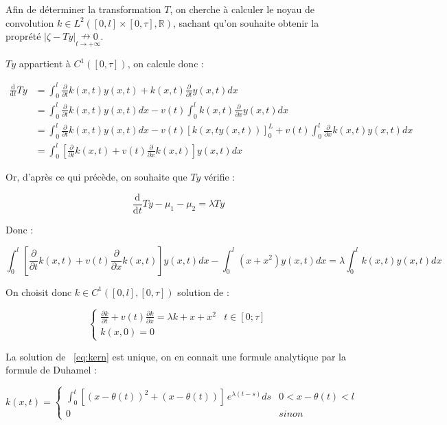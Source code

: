 \documentclass[a4paper]{article}
\begin{document}
Afin de déterminer la transformation $T$, 
on cherche à calculer le noyau de convolution $k \in L^2 ([0,l]\times[0,\tau],\mathbb{R})$,
sachant qu'on souhaite obtenir la proprété $|\zeta - Ty| \underset{t\to+\infty}{\nrightarrow 0}$.

$Ty$ appartient à $C^1([0,\tau])$, on calcule donc :

\[
\begin{split}
	\frac{\mathrm{d}}{\mathrm{d}t}Ty &= \int_0^l \frac{\partial}{\partial t}k(x,t) y(x,t) + k(x,t)\frac{\partial}{\partial t}y(x,t) dx \\
	                                 &= \int_0^l \frac{\partial}{\partial t}k(x,t) y(x,t)dx - v(t) \int_0^l k(x,t)\frac{\partial}{\partial x}y(x,t) dx \\
									 &= \int_0^l \frac{\partial}{\partial t}k(x,t) y(x,t)dx -v(t) [k(x,ty(x,t))]_0^L +v(t) \int_0^l \frac{\partial}{\partial x}k(x,t) y(x,t)dx \\
									 &= \int_0^l [\frac{\partial}{\partial t}k(x,t)+v(t)\frac{\partial}{\partial x}k(x,t)] y(x,t) dx
\end{split}
\]

Or, d'après ce qui précède, on souhaite que $Ty$ vérifie :

\[ \frac{\mathrm{d}}{\mathrm{d}t}Ty - \mu_1 - \mu_2 = \lambda Ty \]

Donc :

\[
\int_0^l [\frac{\partial}{\partial t}k(x,t)+v(t)\frac{\partial}{\partial x}k(x,t)] y(x,t) dx - \int_0^l (x+x^2)y(x,t)dx = \lambda \int_0^l k(x,t)y(x,t)dx  
\]

On choisit donc $k \in C^1([0,l],[0,\tau])$ solution de :

\begin{equation}
\label{eq:kern}
\begin{cases}
 \frac{\partial k}{\partial t}+ v(t) \frac{\partial k} {\partial x}  = \lambda k +x +x^2  & t \in [0;\tau]\\
 k(x,0) = 0 
\end{cases}
\end{equation}

La solution de ~\eqref{eq:kern} est unique, on en connait une formule analytique par la formule de Duhamel :

\begin{equation}
\label{kkern}
k (x,t)=
\begin{cases}
 \displaystyle \int_0^t [(x-\theta(t))^2 + (x-\theta(t))] \, e^{\lambda(t-s)}ds & 0<x-\theta(t)<l\\
 0 & sinon
\end{cases}
\end{equation}
\end{document}
